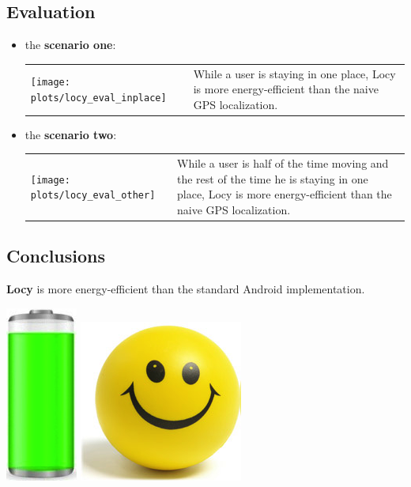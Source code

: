 \documentclass[a2,landscape]{a0poster}
\begin{document}
\mbox{}\framebreak
\begin{center}
\section*{Evaluation}
\end{center}
\begin{itemize}
   \item the \textbf{scenario one}:

\begin{tabular}[t]{p{8.0cm} p{8.0cm}}
       \vspace{0cm}\texttt{[image: plots/locy\_eval\_inplace]} &  \vspace{0cm}While a user is staying in one place, Locy is more energy-efficient than the naive GPS localization.
      \end{tabular}
\vspace{0.3cm}
   \item the \textbf{scenario two}:

\begin{tabular}[t]{p{8.0cm} p{8.0cm}}
	\vspace{0cm}\texttt{[image: plots/locy\_eval\_other]} &  \vspace{0cm}While a user is half of the time moving and the rest of the time he is staying in one place, Locy is more energy-efficient than the naive GPS localization.
\end{tabular}
  \end{itemize}

\begin{center}
\section*{Conclusions}
\end{center}

\textbf{Locy} is more energy-efficient than the standard Android implementation. 
\vspace{1.25cm}
\begin{center}
\includegraphics[scale=0.7]{plots/full_battery}
\includegraphics[scale=0.7]{plots/happy_face}
\end{center}
\end{document}
